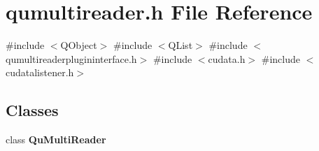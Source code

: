 \section{qumultireader.\+h File Reference}
\label{qumultireader_8h}
{\ttfamily \#include $<$Q\+Object$>$}\newline
{\ttfamily \#include $<$Q\+List$>$}\newline
{\ttfamily \#include $<$qumultireaderplugininterface.\+h$>$}\newline
{\ttfamily \#include $<$cudata.\+h$>$}\newline
{\ttfamily \#include $<$cudatalistener.\+h$>$}\newline
\subsection*{Classes}
\begin{DoxyCompactItemize}
\item 
class \textbf{ Qu\+Multi\+Reader}
\end{DoxyCompactItemize}
